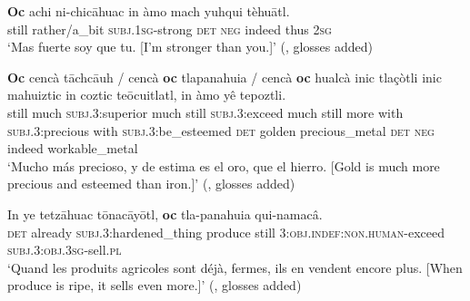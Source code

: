 \begin{exe}
	\ex\label{exAppendixClassicalNahuatlComparative1}
	\gll \textbf{Oc} achi ni-chicāhuac in àmo mach yuhqui tèhuātl.\\
	still rather/a\_bit \textsc{subj}.1\textsc{sg}-strong \textsc{det} \textsc{neg} indeed thus 2\textsc{sg}\\
	\glt \lq Mas fuerte soy que tu. [I'm stronger than you.]\rq{ }(\cite[491]{Carochi1645}, glosses added)
	

	\ex\label{exAppendixClassicalNahuatlComparative2}
	\gll \textbf{Oc} cencà tāchcāuh \textup{/} cencà \textbf{oc} tlapanahuia \textup{/} cencà \textbf{oc} hualcà inic tlaçòtli inic mahuiztic in coztic teōcuitlatl, in àmo yê tepoztli.\\
still much \textsc{subj}.3:superior {} much still \textsc{subj}.3:exceed {} much still more with \textsc{subj}.3:precious with \textsc{subj}.3:be\_esteemed \textsc{det} golden precious\_metal \textsc{det} \textsc{neg} indeed workable\_metal\\
\glt \lq Mucho más precioso, y de estima es el oro, que el hierro. [Gold is much more precious and esteemed than iron.]\rq{ }(\cite[491]{Carochi1645}, glosses added)

	\ex\label{exAppendixClassicalNahuatlComparative3}
\gll In ye tetzāhuac tōnacāyōtl, \textbf{oc} tla-panahuia qui-namacâ.\\
\textsc{det} already \textsc{subj}.3:hardened\_thing produce still 3:\textsc{obj}.\textsc{indef}:\textsc{non}.\textsc{human}-exceed \textsc{subj}.3:\textsc{obj}.3\textsc{sg}-sell.\textsc{pl}
\\ \glt \lq Quand les produits agricoles sont déjà, fermes,
ils en vendent encore plus. [When produce is ripe, it sells even more.]\rq{ }(\cite[1267]{Launey1986}, glosses added)
\end{exe}
\pagebreak
\largerpage[2]

